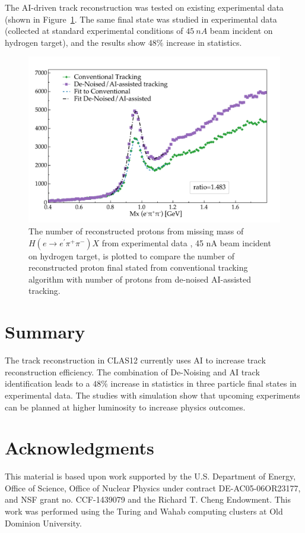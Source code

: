 \documentclass{webofc}
\begin{document}
The AI-driven track reconstruction was tested on existing experimental data (shown in Figure~\ref{physics::conv_vs_dnai}. The same final state 
was studied in experimental data (collected at standard experimental conditions of $45~nA$ beam incident on hydrogen target), and the results
show $48\%$ increase in statistics.

\begin{figure}[!h]
\begin{center}
 \includegraphics[height=2.in]{images/rga_conv_vs_dnai.pdf}
\caption { 
The number of reconstructed protons from missing mass of $H(e \rightarrow e^\prime \pi^+ \pi^-) X$ from experimental data 
, 45 nA beam incident on hydrogen target, is plotted to compare the number of reconstructed proton final stated from conventional tracking algorithm with 
number of protons from de-noised AI-assisted tracking. 
}
 \label{physics::conv_vs_dnai}
 \end{center}
\end{figure}

\section{Summary}
\label{section-summary}

The track reconstruction in CLAS12 currently uses AI to increase track reconstruction efficiency. The combination of De-Noising 
and AI track identification leads to a $48\%$ increase in statistics in three particle final states in experimental data. The studies 
with simulation show that upcoming experiments can be planned at higher luminosity to increase physics outcomes. 

\section{Acknowledgments}
\label{Acknowledgments}

This material is based upon work supported by the U.S. Department of Energy, Office of Science, Office of Nuclear Physics under contract DE-AC05-06OR23177, and
 NSF grant no. CCF-1439079 and the Richard T. Cheng Endowment. This work was performed using the Turing and Wahab computing clusters at Old Dominion University.
 
\end{document}
